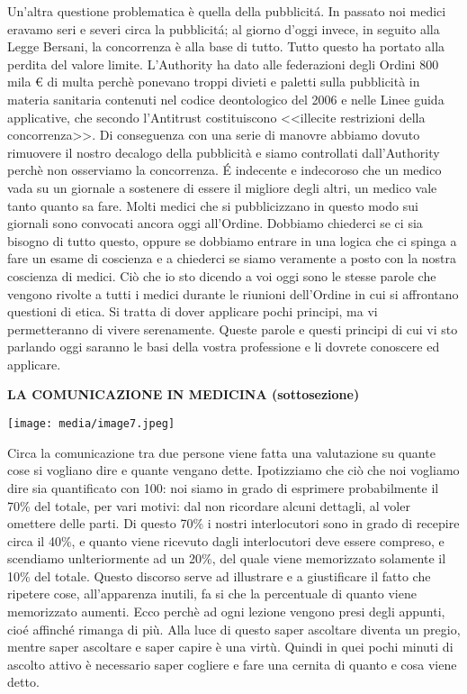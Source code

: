 \documentclass[]{article}
\newcommand{\euro}{€}
\begin{document}
Un'altra questione problematica è quella della pubblicitá. In passato
noi medici eravamo seri e severi circa la pubblicitá; al giorno d'oggi
invece, in seguito alla Legge Bersani, la concorrenza è alla base di
tutto. Tutto questo ha portato alla perdita del valore limite.
L'Authority ha dato alle federazioni degli Ordini 800 mila \euro{} di
multa perchè ponevano troppi divieti e paletti sulla pubblicità in
materia sanitaria contenuti nel codice deontologico del 2006 e nelle
Linee guida applicative, che secondo l'Antitrust costituiscono
\textless{}\textless{}illecite restrizioni della
concorrenza\textgreater{}\textgreater{}. Di conseguenza con una serie di
manovre abbiamo dovuto rimuovere il nostro decalogo della pubblicità e
siamo controllati dall'Authority perchè non osserviamo la concorrenza. É
indecente e indecoroso che un medico vada su un giornale a sostenere di
essere il migliore degli altri, un medico vale tanto quanto sa fare.
Molti medici che si pubblicizzano in questo modo sui giornali sono
convocati ancora oggi all'Ordine. Dobbiamo chiederci se ci sia bisogno
di tutto questo, oppure se dobbiamo entrare in una logica che ci spinga
a fare un esame di coscienza e a chiederci se siamo veramente a posto
con la nostra coscienza di medici. Ciò che io sto dicendo a voi oggi
sono le stesse parole che vengono rivolte a tutti i medici durante le
riunioni dell'Ordine in cui si affrontano questioni di etica. Si tratta
di dover applicare pochi principi, ma vi permetteranno di vivere
serenamente. Queste parole e questi principi di cui vi sto parlando oggi
saranno le basi della vostra professione e li dovrete conoscere ed
applicare.

\textbf{LA COMUNICAZIONE IN MEDICINA (sottosezione)}

\texttt{[image: media/image7.jpeg]}

Circa la comunicazione tra due persone viene fatta una valutazione su
quante cose si vogliano dire e quante vengano dette. Ipotizziamo che ciò
che noi vogliamo dire sia quantificato con 100: noi siamo in grado di
esprimere probabilmente il 70\% del totale, per vari motivi: dal non
ricordare alcuni dettagli, al voler omettere delle parti. Di questo 70\%
i nostri interlocutori sono in grado di recepire circa il 40\%, e quanto
viene ricevuto dagli interlocutori deve essere compreso, e scendiamo
unlteriormente ad un 20\%, del quale viene memorizzato solamente il 10\%
del totale. Questo discorso serve ad illustrare e a giustificare il
fatto che ripetere cose, all'apparenza inutili, fa si che la percentuale
di quanto viene memorizzato aumenti. Ecco perchè ad ogni lezione vengono
presi degli appunti, cioé affinché rimanga di più. Alla luce di questo
saper ascoltare diventa un pregio, mentre saper ascoltare e saper capire
è una virtù. Quindi in quei pochi minuti di ascolto attivo è necessario
saper cogliere e fare una cernita di quanto e cosa viene detto.
\end{document}
